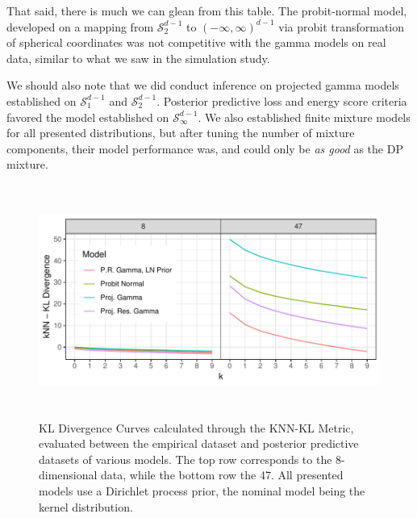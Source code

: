 That said, there is much we can glean from this table.  The probit-normal model, developed on a mapping
  from $\mathcal{S}_{2}^{d-1}$ to $(-\infty,\infty)^{d-1}$ via probit transformation of spherical coordinates
  was not competitive with the gamma models on real data, similar to what we saw in the simulation study.

We should also note that we did conduct inference on projected gamma models established on
  $\mathcal{S}_{1}^{d-1}$ and $\mathcal{S}_2^{d-1}$.  Posterior predictive loss and energy score criteria
  favored the model established on $\mathcal{S}_{\infty}^{d-1}$.   We also established finite mixture
  models for all presented distributions, but after tuning the number of mixture components, their
  model performance was, and could only be \emph{as good} as the DP mixture.

\begin{figure}[h]
  \centering
  \label{fig:knnkl}
  \includegraphics[width = 6in, height = 3in]{./images/knn_kl_divergence_curves}
  \caption{KL Divergence Curves calculated through the KNN-KL Metric, evaluated between the empirical
  dataset and posterior predictive datasets of various models.  The top row corresponds to the
  8-dimensional data, while the bottom row the 47.  All presented models use a Dirichlet process
  prior, the nominal model being the kernel distribution.}
\end{figure}

